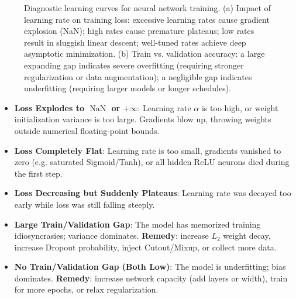 \begin{figure}[H]
\caption{Diagnostic learning curves for neural network training. (a) Impact of learning rate on training loss: excessive learning rates cause gradient explosion (NaN); high rates cause premature plateaus; low rates result in sluggish linear descent; well-tuned rates achieve deep asymptotic minimization. (b) Train vs. validation accuracy: a large expanding gap indicates severe overfitting (requiring stronger regularization or data augmentation); a negligible gap indicates underfitting (requiring larger models or longer schedules).}
\label{fig:diagnostic_curves}
\end{figure}

\begin{itemize}[leftmargin=*]
  \item \textbf{Loss Explodes to $\operatorname{NaN}$ or $+\infty$}: Learning rate $\alpha$ is too high, or weight initialization variance is too large. Gradients blow up, throwing weights outside numerical floating-point bounds.
  \item \textbf{Loss Completely Flat}: Learning rate is too small, gradients vanished to zero (e.g. saturated Sigmoid/Tanh), or all hidden ReLU neurons died during the first step.
  \item \textbf{Loss Decreasing but Suddenly Plateaus}: Learning rate was decayed too early while loss was still falling steeply.
  \item \textbf{Large Train/Validation Gap}: The model has memorized training idiosyncrasies; variance dominates. \textbf{Remedy}: increase $L_2$ weight decay, increase Dropout probability, inject Cutout/Mixup, or collect more data.
  \item \textbf{No Train/Validation Gap (Both Low)}: The model is underfitting; bias dominates. \textbf{Remedy}: increase network capacity (add layers or width), train for more epochs, or relax regularization.
\end{itemize}

